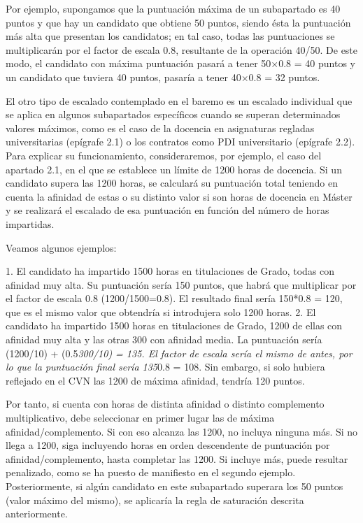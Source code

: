 \documentclass{article}
\begin{document}
\begin{itemize}
\begin{itemize}
\begin{scriptsize}
                  Por ejemplo, supongamos que la puntuación máxima de un subapartado es 40 puntos y que hay un candidato que obtiene 50 puntos, siendo ésta la puntuación más alta que presentan los candidatos; en tal caso, todas las puntuaciones se multiplicarán por el factor de escala 0.8, resultante de la operación 40/50. De este modo, el candidato con máxima puntuación pasará a tener 50×0.8 = 40 puntos y un candidato que tuviera 40 puntos, pasaría a tener 40×0.8 = 32 puntos.

                  El otro tipo de escalado contemplado en el baremo es un escalado individual que se aplica en algunos subapartados específicos cuando se superan determinados valores máximos, como es el caso de la docencia en asignaturas regladas universitarias (epígrafe 2.1) o los contratos como PDI universitario (epígrafe 2.2). Para explicar su funcionamiento, consideraremos, por ejemplo, el caso del apartado 2.1, en el que se establece un límite de 1200 horas de docencia. Si un candidato supera las 1200 horas, se calculará su puntuación total teniendo en cuenta la afinidad de estas o su distinto valor si son horas de docencia en Máster y se realizará el escalado de esa puntuación en función del número de horas impartidas.

                  Veamos algunos ejemplos:

                  1. El candidato ha impartido 1500 horas en titulaciones de Grado, todas con afinidad muy alta. Su puntuación sería 150 puntos, que habrá que multiplicar por el factor de escala 0.8 (1200/1500=0.8). El resultado final sería 150*0.8 = 120, que es el mismo valor que obtendría si introdujera solo 1200 horas.
                  2. El candidato ha impartido 1500 horas en titulaciones de Grado, 1200 de ellas con afinidad muy alta y las otras 300 con afinidad media. La puntuación sería (1200/10) + (0.5\textit{300/10) = 135. El factor de escala sería el mismo de antes, por lo que la puntuación final sería 135}0.8 = 108. Sin embargo, si solo hubiera reflejado en el CVN las 1200 de máxima afinidad, tendría 120 puntos.

                  Por tanto, si cuenta con horas de distinta afinidad o distinto complemento multiplicativo, debe seleccionar en primer lugar las de máxima afinidad/complemento. Si con eso alcanza las 1200, no incluya ninguna más. Si no llega a 1200, siga incluyendo horas en orden descendente de puntuación por afinidad/complemento, hasta completar las 1200. Si incluye más, puede resultar penalizado, como se ha puesto de manifiesto en el segundo ejemplo. Posteriormente, si algún candidato en este subapartado superara los 50 puntos (valor máximo del mismo), se aplicaría la regla de saturación descrita anteriormente.


\end{scriptsize}
\end{itemize}
\end{itemize}
\end{document}
